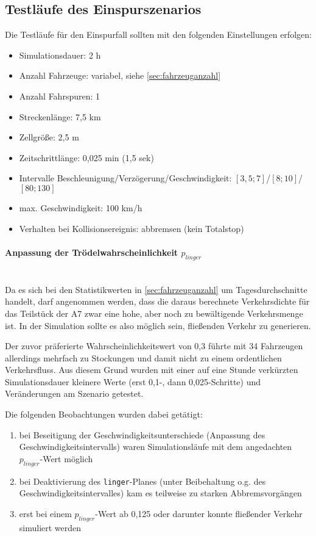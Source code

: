 \subsection{Testläufe des Einspurszenarios}
\label{sec:test-singlelane}

Die Testläufe für den Einspurfall sollten mit den folgenden Einstellungen erfolgen:
\begin{itemize}
	\itemsep0em
	\item Simulationsdauer: 2 h
	\item Anzahl Fahrzeuge: variabel, siehe \cref{sec:fahrzeuganzahl}
	\item Anzahl Fahrspuren: 1
	\item Streckenlänge: 7,5 km 
	\item Zellgröße: 2,5 m
	\item Zeitschrittlänge: 0,025 min (1,5 sek)
	\item Intervalle Beschleunigung/Verzögerung/Geschwindigkeit: $ [3,5; 7] $/$ [8; 10] $/$ [80; 130] $
	\item max. Geschwindigkeit: 100 km/h
	\item Verhalten bei Kollisionsereignis: abbremsen (kein Totalstop)
\end{itemize}


\paragraph*{Anpassung der Trödelwahrscheinlichkeit $p_{linger}$}
\label{sec:adjust-linger}
\hfill \\
Da es sich bei den Statistikwerten in \cref{sec:fahrzeuganzahl} um Tagesdurchschnitte handelt, darf angenommen werden, dass die daraus berechnete Verkehrsdichte für das Teilstück der A7 zwar eine hohe, aber noch zu bewältigende Verkehrsmenge ist.
In der Simulation sollte es also möglich sein, fließenden Verkehr zu generieren.

Der zuvor präferierte Wahrscheinlichkeitswert von 0,3 führte mit 34 Fahrzeugen allerdings mehrfach zu Stockungen und damit nicht zu einem ordentlichen Verkehrsfluss.
Aus diesem Grund wurden mit einer auf eine Stunde verkürzten Simulationsdauer kleinere Werte (erst 0,1-, dann 0,025-Schritte) und Veränderungen am Szenario getestet.

Die folgenden Beobachtungen wurden dabei getätigt:
\begin{enumerate}
	\itemsep0em
	\item bei Beseitigung der Geschwindigkeitsunterschiede (Anpassung des Geschwindigkeitsintervalls) waren Simulationsläufe mit dem angedachten $p_{linger}$-Wert möglich
	\item bei Deaktivierung des \texttt{linger}-Planes (unter Beibehaltung o.g. des Geschwindigkeitsintervalles) kam es teilweise zu starken Abbremsvorgängen
	\item erst bei einem $p_{linger}$-Wert ab 0,125 oder darunter konnte fließender Verkehr simuliert werden
\end{enumerate}

